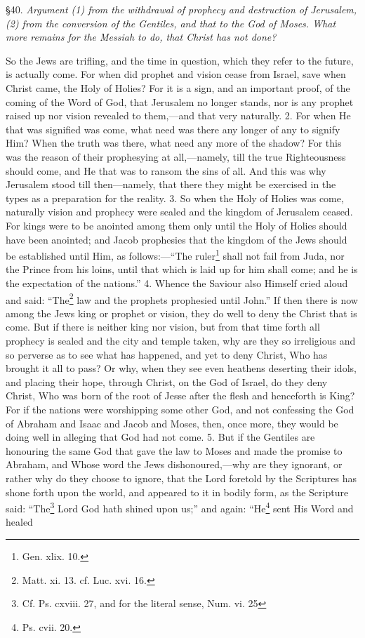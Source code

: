 
§40. \emph{Argument (1) from the withdrawal of prophecy and destruction of Jerusalem, (2) from the conversion of the Gentiles, and that to the God of Moses. What more remains for the Messiah to do, that Christ has not done?}

So the Jews are trifling, and the time in question, which they refer to the future, is actually come. For when did prophet and vision cease from Israel, save when Christ came, the Holy of Holies? For it is a sign, and an important proof, of the coming of the Word of God, that Jerusalem no longer stands, nor is any prophet raised up nor vision revealed to them,—and that very naturally. 2. For when He that was signified was come, what need was there any longer of any to signify Him? When the truth was there, what need any more of the shadow? For this was the reason of their prophesying at all,—namely, till the true Righteousness should come, and He that was to ransom the sins of all. And this was why Jerusalem stood till then—namely, that there they might be exercised in the types as a preparation for the reality. 3. So when the Holy of Holies was come, naturally vision and prophecy were sealed and the kingdom of Jerusalem ceased. For kings were to be anointed among them only until the Holy of Holies should have been anointed; and Jacob prophesies that the kingdom of the Jews should be established until Him, as follows:—“The ruler\footnote{Gen. xlix. 10.} shall not fail from Juda, nor the Prince from his loins, until that which is laid up for him shall come; and he is the expectation of the nations.” 4. Whence the Saviour also Himself cried aloud and said: “The\footnote{Matt. xi. 13. cf. Luc. xvi. 16.} law and the prophets prophesied until John.” If then there is now among the Jews king or prophet or vision, they do well to deny the Christ that is come. But if there is neither king nor vision, but from that time forth all prophecy is sealed and the city and temple taken, why are they so irreligious and so perverse as to see what has happened, and yet to deny Christ, Who has brought it all to pass? Or why, when they see even heathens deserting their idols, and placing their hope, through Christ, on the God of Israel, do they deny Christ, Who was born of the root of Jesse after the flesh and henceforth is King? For if the nations were worshipping some other God, and not confessing the God of Abraham and Isaac and Jacob and Moses, then, once more, they would be doing well in alleging that God had not come. 5. But if the Gentiles are honouring the same God that gave the law to Moses and made the promise to Abraham, and Whose word the Jews dishonoured,—why are they ignorant, or rather why do they choose to ignore, that the Lord foretold by the Scriptures has shone forth upon the world, and appeared to it in bodily form, as the Scripture said: “The\footnote{Cf. Ps. cxviii. 27, and for the literal sense, Num. vi. 25} Lord God hath shined upon us;” and again: “He\footnote{Ps. cvii. 20.} sent His Word and healed 
